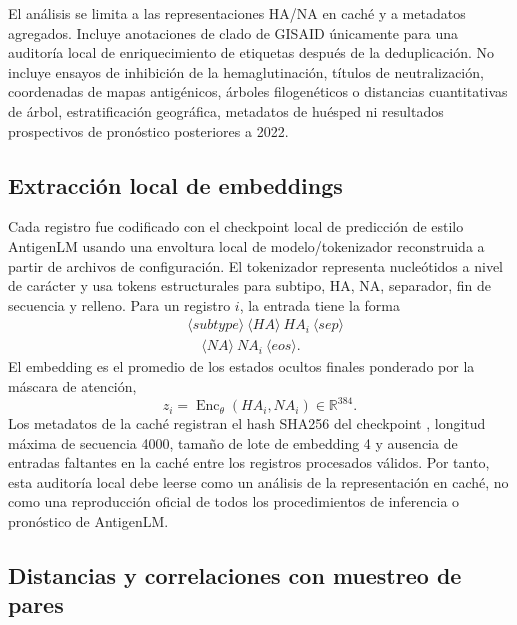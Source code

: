 \documentclass[11pt]{article}
\newcommand{\Enc}{\operatorname{Enc}}
\newcommand{\R}{\mathbb{R}}
\begin{document}
El análisis se limita a las representaciones HA/NA en caché y a metadatos agregados. Incluye anotaciones de clado de GISAID únicamente para una auditoría local de enriquecimiento de etiquetas después de la deduplicación. No incluye ensayos de inhibición de la hemaglutinación, títulos de neutralización, coordenadas de mapas antigénicos, árboles filogenéticos o distancias cuantitativas de árbol, estratificación geográfica, metadatos de huésped ni resultados prospectivos de pronóstico posteriores a 2022.

\subsection{Extracción local de embeddings}

Cada registro fue codificado con el checkpoint local de predicción de estilo AntigenLM  usando una envoltura local de modelo/tokenizador reconstruida a partir de archivos de configuración. El tokenizador representa nucleótidos a nivel de carácter y usa tokens estructurales para subtipo, HA, NA, separador, fin de secuencia y relleno. Para un registro $i$, la entrada tiene la forma
\[
\begin{aligned}
&\langle subtype\rangle \ \langle HA\rangle \ HA_i \ \langle sep\rangle \\
&\quad \langle NA\rangle \ NA_i \ \langle eos\rangle .
\end{aligned}
\]
El embedding es el promedio de los estados ocultos finales ponderado por la máscara de atención,
\[
z_i=\Enc_{\theta}(HA_i,NA_i)\in\R^{384}.
\]
Los metadatos de la caché registran el hash SHA256 del checkpoint
, longitud máxima de secuencia 4000, tamaño de lote de embedding 4 y ausencia de entradas faltantes en la caché entre los registros procesados válidos. Por tanto, esta auditoría local debe leerse como un análisis de la representación en caché, no como una reproducción oficial de todos los procedimientos de inferencia o pronóstico de AntigenLM.

\subsection{Distancias y correlaciones con muestreo de pares}
\end{document}
